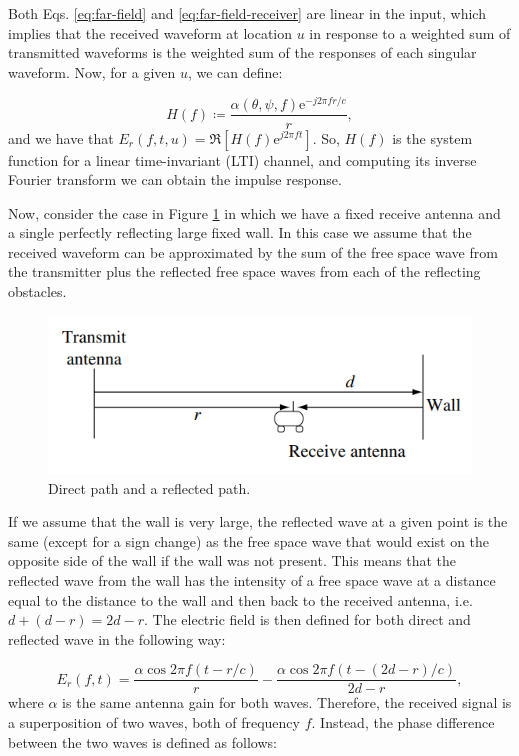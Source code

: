 \documentclass[binding=0.6cm,noexaminfo]{sapthesis}
\begin{document}
Both Eqs. \ref{eq:far-field} and \ref{eq:far-field-receiver} are linear in the input, which implies that the received waveform at location $u$ in response to a weighted sum of transmitted waveforms is the weighted sum of the responses of each singular waveform.
Now, for a given $u$, we can define:

\begin{equation}
H(f) \coloneqq \frac{\alpha (\theta, \psi, f) \text{e}^{-j 2 \pi fr / c}}{r},
\end{equation}
and we have that $E_r(f, t, u) = \Re \left[ H(f) \text{e}^{j 2 \pi ft} \right]$. So, $H(f)$ is the system function for a linear time-invariant (LTI) channel, and computing its inverse Fourier transform we can obtain the impulse response.

Now, consider the case in Figure \ref{fig:signal-wall} in which we have a fixed receive antenna and a single perfectly reflecting large fixed wall. In this case we assume that the received waveform can be approximated by the sum of the free space wave from the transmitter plus the reflected free space waves from each of the reflecting obstacles.

\begin{figure}[h!]
\centering
\includegraphics[width=.5\linewidth]{signal-wall}
\caption{Direct path and a reflected path.}
\label{fig:signal-wall}
\end{figure}

If we assume that the wall is very large, the reflected wave at a given point is the same (except for a sign change) as the free space wave that would exist on the opposite side of the wall if the wall was not present. This means that the reflected wave from the wall has the intensity of a free space wave at a distance equal to the distance to the wall and then back to the received antenna, i.e. $d + (d - r) = 2d - r$. The electric field is then defined for both direct and reflected wave in the following way:

\begin{equation}
E_r(f, t) = \frac{\alpha \cos 2 \pi f(t - r / c)}{r} - \frac{\alpha \cos 2 \pi f (t - (2d - r) / c)}{2d - r},
\end{equation}
where $\alpha$ is the same antenna gain for both waves. Therefore, the received signal is a superposition of two waves, both of frequency $f$.
Instead, the phase difference between the two waves is defined as follows:
\end{document}
